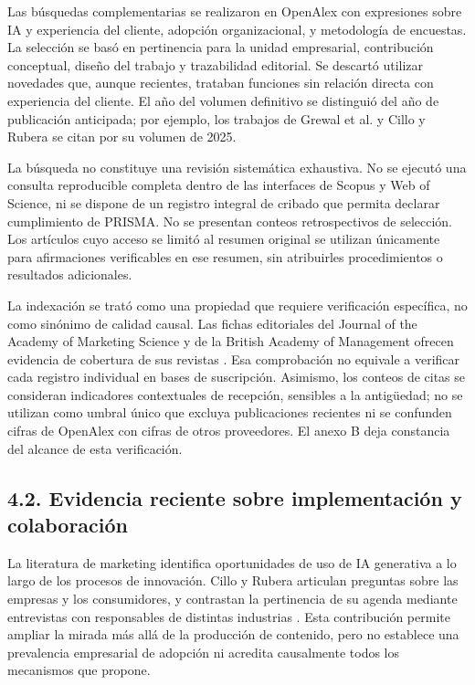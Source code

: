 \documentclass[12pt,letterpaper]{article}
\begin{document}
Las búsquedas complementarias se realizaron en OpenAlex con expresiones sobre IA y experiencia del cliente, adopción organizacional, y metodología de encuestas. La selección se basó en pertinencia para la unidad empresarial, contribución conceptual, diseño del trabajo y trazabilidad editorial. Se descartó utilizar novedades que, aunque recientes, trataban funciones sin relación directa con experiencia del cliente. El año del volumen definitivo se distinguió del año de publicación anticipada; por ejemplo, los trabajos de Grewal et al. y Cillo y Rubera se citan por su volumen de 2025.

La búsqueda no constituye una revisión sistemática exhaustiva. No se ejecutó una consulta reproducible completa dentro de las interfaces de Scopus y Web of Science, ni se dispone de un registro integral de cribado que permita declarar cumplimiento de PRISMA. No se presentan conteos retrospectivos de selección. Los artículos cuyo acceso se limitó al resumen original se utilizan únicamente para afirmaciones verificables en ese resumen, sin atribuirles procedimientos o resultados adicionales.

La indexación se trató como una propiedad que requiere verificación específica, no como sinónimo de calidad causal. Las fichas editoriales del Journal of the Academy of Marketing Science y de la British Academy of Management ofrecen evidencia de cobertura de sus revistas \citep{bjm,jams}. Esa comprobación no equivale a verificar cada registro individual en bases de suscripción. Asimismo, los conteos de citas se consideran indicadores contextuales de recepción, sensibles a la antigüedad; no se utilizan como umbral único que excluya publicaciones recientes ni se confunden cifras de OpenAlex con cifras de otros proveedores. El anexo B deja constancia del alcance de esta verificación.

\subsection*{4.2. Evidencia reciente sobre implementación y colaboración}
La literatura de marketing identifica oportunidades de uso de IA generativa a lo largo de los procesos de innovación. Cillo y Rubera articulan preguntas sobre las empresas y los consumidores, y contrastan la pertinencia de su agenda mediante entrevistas con responsables de distintas industrias \citep{cillo}. Esta contribución permite ampliar la mirada más allá de la producción de contenido, pero no establece una prevalencia empresarial de adopción ni acredita causalmente todos los mecanismos que propone.
\end{document}
